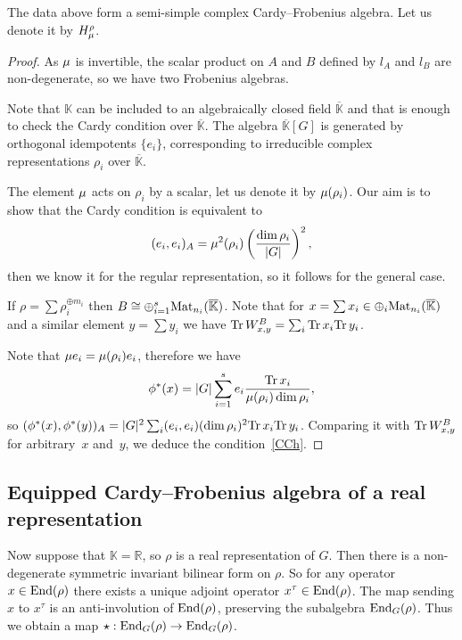 \documentclass[pdftex]{sigma}
\newcommand{\tr}{\mathop{\sf tr}\nolimits}
\def \R {{\mathbb R}}
\def \tr {{\rm Tr}\,}
\def \mat {{\rm Mat}}
\def \ens {{\rm End}}
\def \F {{\mathbb K}}
\def \oF {\overline{\mathbb K}}
\def \Mu {{\bf \mu}}
\begin{document}
\begin{proposition}
The data above form a semi-simple complex Cardy--Frobenius algebra. Let us denote it by $H^\rho_\Mu$.
\end{proposition}

\begin{proof}
As $\Mu$ is invertible, the scalar product on $A$ and $B$ def\/ined by $l_A$ and $l_B$
are non-degenerate, so we have two Frobenius algebras.

Note that $\F$ can be included to an algebraically closed f\/ield $\oF$ and that is  enough
to check the Cardy condition over $\oF$.
The algebra $\oF[G]$ is generated by orthogonal idempotents
$\{e_i\}$,
 corresponding to  irreducible complex representations $\rho_i$ over $\oF$.

The element $\Mu$ acts on $\rho_i$ by a scalar,
let us denote it by $\Mu(\rho_i)$.
Our aim is to show  that the Cardy condition is equivalent to
\begin{gather}\label{CCh}
(e_i, e_i)_A = \Mu^2(\rho_i) \left(\frac{\dim \rho_i}{|G|}\right)^2,
\end{gather}
then we know it for the regular representation, so it
follows for the general case.



If $\rho = \sum \rho_i^{\oplus m_i}$ then $B \cong
\oplus_{i=1}^s\mat_{n_i}(\oF)$.
Note that for $x = \sum x_i \in \oplus_i \mat_{n_i}(\oF)$
and a similar element $y = \sum y_i$
we have
 $\tr W^B_{x,y} =\sum_i \tr x_i \tr y_i$.

Note that $\Mu e_i = \Mu(\rho_i) e_i$, therefore we have
\[
\phi^*(x) = |G| \sum_{i=1}^s e_i \frac{\tr x_i}{\Mu (\rho_i) \dim \rho_i},
\]
so $(\phi^*(x), \phi^*(y))_A = |G|^2 \sum_i (e_i,e_i) (\dim \rho_i)^2  \tr x_i \tr y_i$.
Comparing it with $\tr W^B_{x,y}$ for arbitrary~$x$ and~$y$, we deduce the condition~\eqref{CCh}.
\end{proof}

\subsection[Equipped Cardy-Frobenius algebra of a real representation]{Equipped Cardy--Frobenius algebra of a real representation}\label{s4.2}


Now suppose that $\F = \R$, so $\rho$  is a real representation of $G$.
Then
there is a non-degenerate
symmetric invariant bilinear form on $\rho$.
So for any
operator $x \in \ens (\rho)$
there exists a unique adjoint operator $x^\tau \in \ens (\rho)$.
The map sending $x$ to $x^\tau$ is an anti-involution of $\ens (\rho)$,
preserving the subalgebra  $\ens_G (\rho)$. Thus we obtain a
map $\star : \ens_G(\rho) \to \ens_G(\rho)$.
\end{document}
